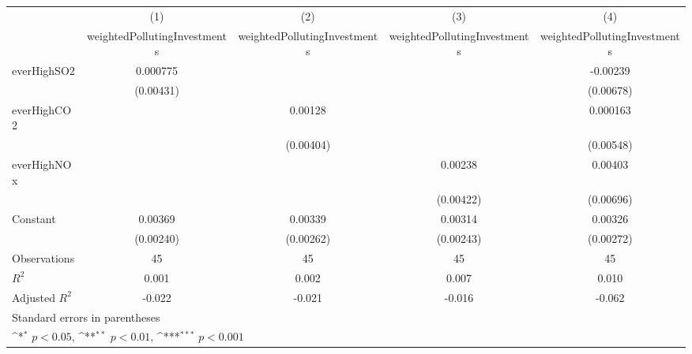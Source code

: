 {
\def\sym#1{\ifmmode^{#1}\else\(^{#1}\)\fi}
\begin{tabular}{l*{4}{c}}
\toprule
                    &\multicolumn{1}{c}{(1)}&\multicolumn{1}{c}{(2)}&\multicolumn{1}{c}{(3)}&\multicolumn{1}{c}{(4)}\\
                    &\multicolumn{1}{c}{weightedPollutingInvestments}&\multicolumn{1}{c}{weightedPollutingInvestments}&\multicolumn{1}{c}{weightedPollutingInvestments}&\multicolumn{1}{c}{weightedPollutingInvestments}\\
\midrule
everHighSO2         &    0.000775         &                     &                     &    -0.00239         \\
                    &   (0.00431)         &                     &                     &   (0.00678)         \\
\addlinespace
everHighCO2         &                     &     0.00128         &                     &    0.000163         \\
                    &                     &   (0.00404)         &                     &   (0.00548)         \\
\addlinespace
everHighNOx         &                     &                     &     0.00238         &     0.00403         \\
                    &                     &                     &   (0.00422)         &   (0.00696)         \\
\addlinespace
Constant            &     0.00369         &     0.00339         &     0.00314         &     0.00326         \\
                    &   (0.00240)         &   (0.00262)         &   (0.00243)         &   (0.00272)         \\
\midrule
Observations        &          45         &          45         &          45         &          45         \\
\(R^{2}\)           &       0.001         &       0.002         &       0.007         &       0.010         \\
Adjusted \(R^{2}\)  &      -0.022         &      -0.021         &      -0.016         &      -0.062         \\
\bottomrule
\multicolumn{5}{l}{\footnotesize Standard errors in parentheses}\\
\multicolumn{5}{l}{\footnotesize \sym{*} \(p<0.05\), \sym{**} \(p<0.01\), \sym{***} \(p<0.001\)}\\
\end{tabular}
}
